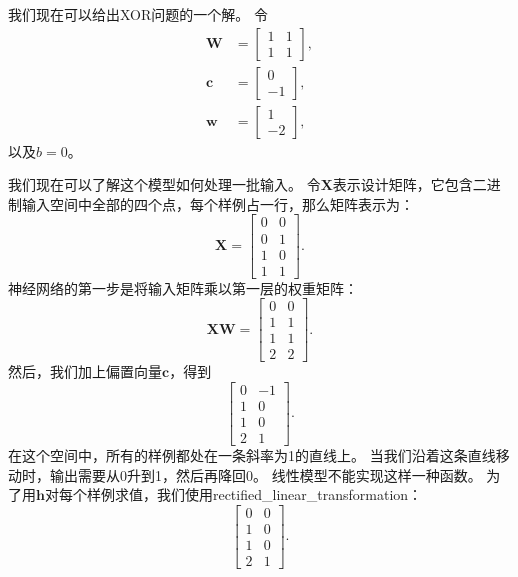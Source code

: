 我们现在可以给出XOR问题的一个解。
令
\begin{align}
\bm{W} &= \begin{bmatrix}
1 & 1\\
1 & 1
\end{bmatrix},\\
\bm{c} &= \begin{bmatrix}
0\\
-1
\end{bmatrix},\\
\bm{w} &= \begin{bmatrix}
1\\
-2
\end{bmatrix},
\end{align}
以及$b=0$。

我们现在可以了解这个模型如何处理一批输入。
令$\bm{X}$表示设计矩阵，它包含二进制输入空间中全部的四个点，每个样例占一行，那么矩阵表示为：
\begin{equation} 
\bm{X} = \begin{bmatrix}
0 & 0\\
0 & 1\\ 
1 & 0\\ 
1 & 1
\end{bmatrix}. 
\end{equation} 
神经网络的第一步是将输入矩阵乘以第一层的权重矩阵： 
\begin{equation}
\bm{X}\bm{W} = \begin{bmatrix} 
0 & 0\\ 
1 & 1\\ 
1 & 1\\ 
2 & 2 
\end{bmatrix}.
\end{equation} 
然后，我们加上偏置向量$\bm{c}$，得到 
\begin{equation} 
\begin{bmatrix} 
0 & -1\\
1 & 0\\ 
1 & 0\\ 
2 & 1 
\end{bmatrix}. 
\end{equation}
在这个空间中，所有的样例都处在一条斜率为1的直线上。
当我们沿着这条直线移动时，输出需要从0升到1，然后再降回0。
线性模型不能实现这样一种函数。
为了用$\bm{h}$对每个样例求值，我们使用\gls{rectified_linear_transformation}： 
\begin{equation}
\begin{bmatrix} 
0 & 0\\ 
1 & 0\\ 
1 & 0\\ 
2 & 1 
\end{bmatrix}. 
\end{equation}

